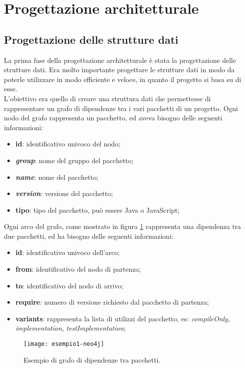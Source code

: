 
\section{Progettazione architetturale}
\subsection*{Progettazione delle strutture dati}
La prima fase della progettazione architetturale è stata la progettazione delle strutture dati. 
Era molto importante progettare le strutture dati in modo da poterle utilizzare in modo efficiente e 
veloce, in quanto il progetto si basa su di esse.\\
L'obiettivo era quello di creare una struttura dati che permettesse di rappresentare un grafo di dipendenze tra i vari pacchetti di un progetto.
Ogni nodo del grafo rappresenta un pacchetto, ed aveva bisogno delle seguenti informazioni:
\begin{itemize}
  \item \textbf{id}: identificativo univoco del nodo;
  \item \textbf{\textit{group}}: nome del gruppo del pacchetto;
  \item \textbf{\textit{name}}: nome del pacchetto;
  \item \textbf{\textit{version}}: versione del pacchetto;
  \item \textbf{tipo}: tipo del pacchetto, può essere Java o JavaScript;
\end{itemize}

\noindent Ogni arco del grafo, come mostrato in figura \ref*{fig:esempio1-neo4j} rappresenta una dipendenza tra due pacchetti, 
ed ha bisogno delle seguenti informazioni:
\begin{itemize}
  \item \textbf{id}: identificativo univoco dell'arco;
  \item \textbf{from}: identificativo del nodo di partenza;
  \item \textbf{to}: identificativo del nodo di arrivo;
  \item \textbf{require}: numero di versione richiesto dal pacchetto di partenza;
  \item \textbf{variants}: rappresenta la lista di utilizzi del pacchetto, es: \textit{compileOnly, implementation, testImplementation}; 
\end{itemize}

\begin{figure}[!h] 
  \centering 
  \texttt{[image: esempio1-neo4j]} 
  \caption{Esempio di grafo di dipendenze tra pacchetti.}
  \label{fig:esempio1-neo4j}
\end{figure}

